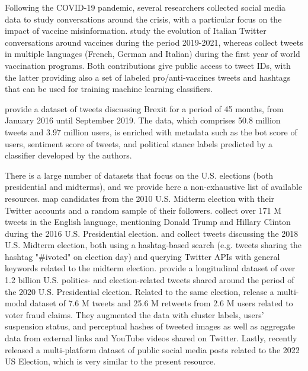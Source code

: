 \documentclass[sigconf,screen]{acmart}
\begin{document}
Following the COVID-19 pandemic, several researchers collected social media data to study conversations around the crisis, with a particular focus on the impact of vaccine misinformation. \cite{crupi2022echoes} study the evolution of Italian Twitter conversations around vaccines during the period 2019-2021,
whereas \cite{di2022vaccineu} collect tweets in multiple languages (French, German and Italian) during the first year of world vaccination programs. Both contributions give public access to tweet IDs, with the latter providing also a set of labeled pro/anti-vaccines tweets and hashtags that can be used for training machine learning classifiers.

\cite{calisir2020long} provide a dataset of tweets discussing Brexit for a period of 45 months, from January 2016 until September 2019. The data, which comprises 50.8 million tweets and 3.97 million users, is enriched with metadata such as the bot score of users, sentiment score of tweets, and political stance labels predicted by a classifier developed by the authors.

There is a large number of datasets that focus on the U.S. elections (both presidential and midterms), and we provide here a non-exhaustive list of available resources. \cite{hanna2011mapping} map candidates from the 2010 U.S. Midterm election with their Twitter accounts and a random sample of their followers. \cite{bovet2019influence}  collect over 171 M tweets in the English language, mentioning Donald Trump and Hillary Clinton during the 2016 U.S. Presidential election. \cite{deb2019perils} and \cite{yang2022twitter} collect tweets discussing the 2018 U.S. Midterm election, both using a hashtag-based search (e.g. tweets sharing the hashtag "\#ivoted" on election day) and querying Twitter APIs with general keywords related to the midterm election. \cite{chen2022election2020} provide a longitudinal dataset of over 1.2 billion U.S. politics- and election-related tweets shared around the period of the 2020 U.S. Presidential election. Related to the same election, \cite{abilov2021voterfraud2020} release a multi-modal dataset of 7.6 M tweets and 25.6 M retweets from 2.6 M users related to voter fraud claims. They augmented the data with cluster labels, users' suspension status, and perceptual hashes of tweeted images as well as aggregate data from external links and YouTube videos shared on Twitter. Lastly, \cite{aiyappa2023multi} recently released a multi-platform dataset of public social media posts related to the 2022 US Election, which is very similar to the present resource.
\end{document}
